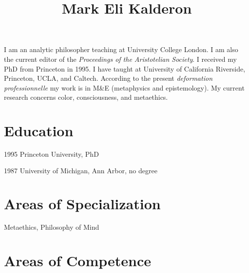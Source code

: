 \documentclass[contbibnum]{cv}
\begin{document}


\title{Mark Eli Kalderon}

\maketitle

I am an analytic philosopher teaching at University College London. I am also the current editor of the \emph{Proceedings of the Aristotelian Society}. I received my PhD from Princeton in 1995. I have taught at University of California Riverside, Princeton, UCLA, and Caltech. According to the present \emph{deformation professionnelle} my work is in M\&E (metaphysics and epistemology). My current research concerns color, consciousness, and metaethics.

\section{Education}\label{sec:education} %

\begin{topic}
\item[1995] Princeton University, PhD
\item[1987] University of Michigan, Ann Arbor, no degree
\end{topic}


\section{Areas of Specialization}\label{sec:areas_of_specialization} %

\begin{topic}
    \item Metaethics, Philosophy of Mind
\end{topic}


\section{Areas of Competence}\label{sec:areas_of_competence} %
\end{document}

